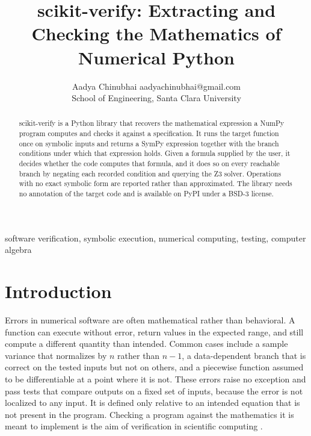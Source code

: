 \documentclass[twoside,11pt]{article}
\begin{document}
\title{scikit-verify: Extracting and Checking the Mathematics of\\ Numerical Python}

\author{\name Aadya Chinubhai \email aadyachinubhai@gmail.com \\
        \addr School of Engineering, Santa Clara University}

\editor{}

\maketitle

\begin{abstract}
scikit-verify is a Python library that recovers the mathematical
expression a NumPy program computes and checks it against a
specification. It runs the target function once on symbolic inputs and
returns a SymPy expression together with the branch conditions under
which that expression holds. Given a formula supplied by the user, it
decides whether the code computes that formula, and it does so on every
reachable branch by negating each recorded condition and querying the
Z3 solver. Operations with no exact symbolic form are reported rather
than approximated. The library needs no annotation of the target code
and is available on PyPI under a BSD-3 license.
\end{abstract}

\begin{keywords}
  software verification, symbolic execution, numerical computing,
  testing, computer algebra
\end{keywords}

\section{Introduction}

Errors in numerical software are often mathematical rather than
behavioral. A function can execute without error, return values in the
expected range, and still compute a different quantity than intended.
Common cases include a sample variance that normalizes by $n$ rather
than $n-1$, a data-dependent branch that is correct on the tested
inputs but not on others, and a piecewise function assumed to be
differentiable at a point where it is not. These errors raise no
exception and pass tests that compare outputs on a fixed set of inputs,
because the error is not localized to any input. It is defined only
relative to an intended equation that is not present in the program.
Checking a program against the mathematics it is meant to implement is
the aim of verification in scientific computing \citep{oberkampf2010}.
\end{document}
